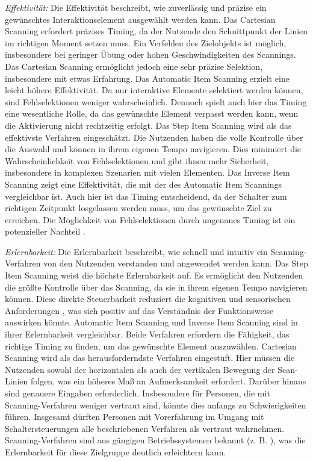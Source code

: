 \textit{Effektivität:}
Die Effektivität beschreibt, wie zuverlässig und präzise ein gewünschtes Interaktionselement ausgewählt werden kann. Das Cartesian Scanning erfordert präzises Timing, da der Nutzende den Schnittpunkt der Linien im richtigen Moment setzen muss. Ein Verfehlen des Zielobjekts ist möglich, insbesondere bei geringer Übung oder hohen Geschwindigkeiten des Scannings. Das Cartesian Scanning ermöglicht jedoch eine sehr präzise Selektion, insbesondere mit etwas Erfahrung. 
Das Automatic Item Scanning erzielt eine leicht höhere Effektivität. Da nur interaktive Elemente selektiert werden können, sind Fehlselektionen weniger wahrscheinlich. Dennoch spielt auch hier das Timing eine wesentliche Rolle, da das gewünschte Element verpasst werden kann, wenn die Aktivierung nicht rechtzeitig erfolgt. Das Step Item Scanning wird als das effektivste Verfahren eingeschätzt. Die Nutzenden haben die volle Kontrolle über die Auswahl und können in ihrem eigenen Tempo navigieren. Dies minimiert die Wahrscheinlichkeit von Fehlselektionen und gibt ihnen mehr Sicherheit, insbesondere in komplexen Szenarien mit vielen Elementen. Das Inverse Item Scanning zeigt eine Effektivität, die mit der des Automatic Item Scannings vergleichbar ist. Auch hier ist das Timing entscheidend, da der Schalter zum richtigen Zeitpunkt losgelassen werden muss, um das gewünschte Ziel zu erreichen. Die Möglichkeit von Fehlselektionen durch ungenaues Timing ist ein potenzieller Nachteil \citep{COOK2015117}.

\textit{Erlernbarkeit:}
Die Erlernbarkeit beschreibt, wie schnell und intuitiv ein Scanning-Verfahren von den Nutzenden verstanden und angewendet werden kann. Das Step Item Scanning weist die höchste Erlernbarkeit auf. Es ermöglicht den Nutzenden die größte Kontrolle über das Scanning, da sie in ihrem eigenen Tempo navigieren können. Diese direkte Steuerbarkeit reduziert die kognitiven und sensorischen Anforderungen \citep{cook_chapter_2015}, was sich positiv auf das Verständnis der Funktionsweise auswirken könnte. Automatic Item Scanning und Inverse Item Scanning sind in ihrer Erlernbarkeit vergleichbar. Beide Verfahren erfordern die Fähigkeit, das richtige Timing zu finden, um das gewünschte Element auszuwählen. Cartesian Scanning wird als das herausforderndste Verfahren eingestuft. Hier müssen die Nutzenden sowohl der horizontalen als auch der vertikalen Bewegung der Scan-Linien folgen, was ein höheres Maß an Aufmerksamkeit erfordert. Darüber hinaus sind genauere Eingaben erforderlich. Insbesondere für Personen, die mit Scanning-Verfahren weniger vertraut sind, könnte dies anfangs zu Schwierigkeiten führen.
Insgesamt dürften Personen mit Vorerfahrung im Umgang mit Schaltersteuerungen alle beschriebenen Verfahren als vertraut wahrnehmen. Scanning-Verfahren sind aus gängigen Betriebssystemen bekannt (z. B. \citep{apple_einfuhrung_2024, Google-Switch-Access}), was die Erlernbarkeit für diese Zielgruppe deutlich erleichtern kann.

